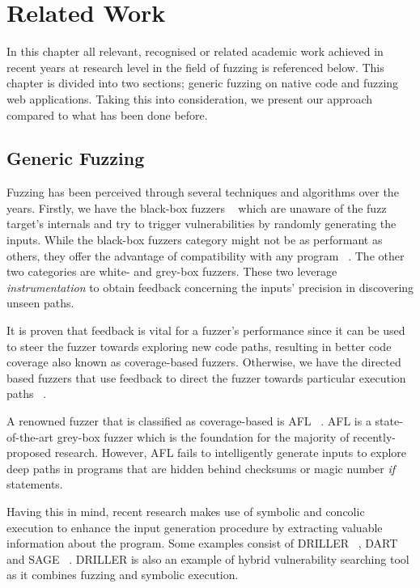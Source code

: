 \chapter{Related Work}
\label{sec:relatedwork}
\minitoc
\vspace*{1cm}

In this chapter all relevant, recognised or related academic work achieved in recent years at research level in the field of fuzzing is referenced below. This chapter is divided into two sections; generic fuzzing on native code and fuzzing web applications. Taking this into consideration, we present our approach compared to what has been done before.

\section{Generic Fuzzing}
Fuzzing has been perceived through several techniques and algorithms over the years. Firstly, we have the black-box fuzzers ~\cite{householder2012probability,sparks2007automated,woo2013scheduling} which are unaware of the fuzz target's internals and try to trigger vulnerabilities by randomly generating the inputs. While the black-box fuzzers category might not be as performant as others, they offer
the advantage of compatibility with any program ~\cite{osterlund2020parmesan,rawat2017vuzzer}. The other two categories are white- and grey-box fuzzers. These two leverage \emph{instrumentation} to obtain feedback concerning the inputs' precision in discovering unseen paths. 

It is proven that feedback is vital for a fuzzer's performance since it can be used to steer the fuzzer towards exploring new code paths, resulting in better code coverage also known as
coverage-based fuzzers. Otherwise, we have the directed based fuzzers that use feedback to direct the fuzzer towards particular execution paths ~\cite{godefroid2005dart}.

A renowned fuzzer that is classified as coverage-based is AFL ~\cite{zalewski2015american}. AFL is a state-of-the-art grey-box fuzzer which is the foundation for the majority of recently-proposed research. However, AFL fails to intelligently generate inputs to explore deep paths in programs that are hidden behind checksums or magic number \emph{if} statements.

Having this in mind, recent research makes use of symbolic and concolic execution to enhance the input generation procedure by extracting valuable information about the program. Some examples consist of DRILLER ~\cite{stephens2016driller}, DART ~\cite{godefroid2005dart} and SAGE ~\cite{godefroid2012sage}. DRILLER is also an example of hybrid vulnerability searching tool as it combines fuzzing and symbolic execution.

